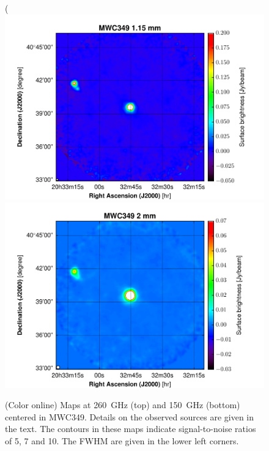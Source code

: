 \documentclass[]{aa} %
\begin{document}
\begin{figure}[h]
   \centering(
   \includegraphics[width=.75\linewidth]{MWC349_1mm_map_snrcont.pdf}
    \includegraphics[width=.75\linewidth]{MWC349_2mm_map_snrcont.pdf} 
      \caption{(Color online) Maps at 260~GHz (top) and 150~GHz (bottom) centered in MWC349. Details on the observed sources are given in the text. The contours in these maps indicate signal-to-noise ratios of 5, 7 and 10. The FWHM are given in the lower left corners.
         \label{fig_compact_sources1}}
\end{figure}
\end{document}
